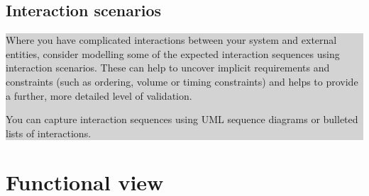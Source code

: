 \documentclass[a4paper,11pt]{report}
\newcommand{\instructions}[1]{
  \noindent\colorbox{lightgray}{%
    \parbox{\linewidth}{%
      #1
    }%
  }%
 \vspace{0.1cm}
}
\begin{document}
\subsection{Interaction scenarios}
\label{sec:inter-scen}

\instructions{
Where you have complicated interactions between your system and
external entities, consider modelling some of the expected interaction
sequences using interaction scenarios. These can help to uncover
implicit requirements and constraints (such as ordering, volume or
timing constraints) and helps to provide a further, more detailed
level of validation.

You can capture interaction sequences using UML sequence diagrams or
bulleted lists of interactions.

}

\section{Functional view}
\label{sec:functional-view}
\end{document}

